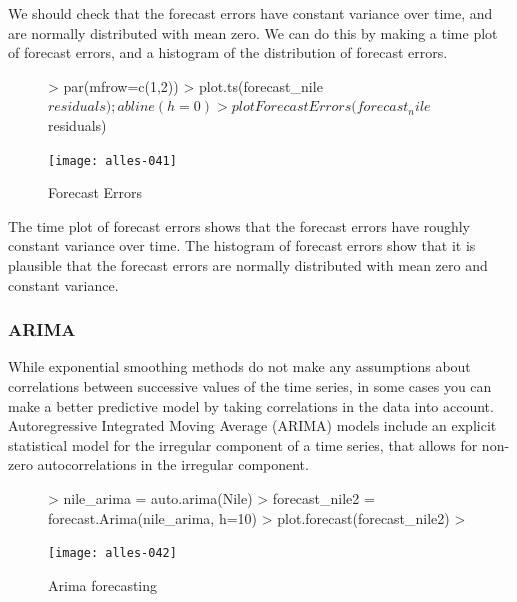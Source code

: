 \documentclass[11pt, a4paper]{article} %
\begin{document}
\noindent We should check that the forecast errors have constant variance over time, and are normally distributed with mean zero. We can do this by making a time plot of forecast errors, and a histogram of the distribution of forecast errors.



\begin{figure}
\centering
\begin{Schunk}
\begin{Sinput}
> par(mfrow=c(1,2))
> plot.ts(forecast_nile$residuals);abline(h=0)
> plotForecastErrors(forecast_nile$residuals)
\end{Sinput}
\end{Schunk}
\texttt{[image: alles-041]}
\caption{Forecast Errors}
\end{figure}

\noindent The time plot of forecast errors shows that the forecast errors have roughly constant variance over time. The histogram of forecast errors show that it is plausible that the forecast errors are normally distributed with mean zero and constant variance.

\subsubsection{ARIMA}

\noindent While exponential smoothing methods do not make any assumptions about correlations between successive values of the time series, in some cases you can make a better predictive model by taking correlations in the data into account. Autoregressive Integrated Moving Average (ARIMA) models include an explicit statistical model for the irregular component of a time series, that allows for non-zero autocorrelations in the irregular component.
\begin{figure}
\centering
\begin{Schunk}
\begin{Sinput}
> nile_arima = auto.arima(Nile)
> forecast_nile2 = forecast.Arima(nile_arima, h=10)
> plot.forecast(forecast_nile2)
> 
\end{Sinput}
\end{Schunk}
\texttt{[image: alles-042]}
\caption{Arima forecasting}
\end{figure}
\end{document}
